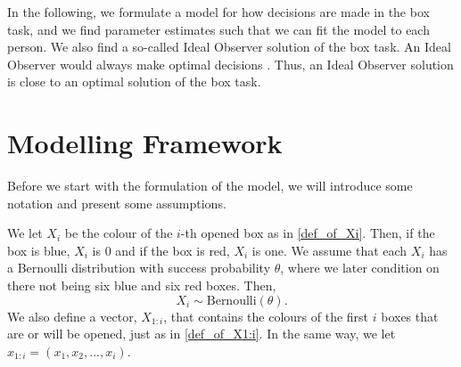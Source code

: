 In the following, we formulate a model for how decisions are made in the box task, and we find parameter estimates such that we can fit the model to each person. We also find a so-called Ideal Observer solution of the box task. An Ideal Observer would always make optimal decisions \citep{idealObs}. Thus, an Ideal Observer solution is close to an optimal solution of the box task. 



\section{Modelling Framework}
\label{section_notation}
Before we start with the formulation of the model, we will introduce some notation and present some assumptions. 

We let $X_i$ be the colour of the $i$-th opened box as in \eqref{def_of_Xi}. Then, if the box is blue, $X_i$ is 0 and if the box is red, $X_i$ is one.
We assume that each $X_i$ has a Bernoulli distribution with success probability $\theta$, where we later condition on there not being six blue and six red boxes. Then,
\begin{equation*}
    X_i \sim \text{Bernoulli}(\theta).
\end{equation*}
We also define a vector, $X_{1:i}$, that contains the colours of the first $i$ boxes that are or will be opened, just as in \eqref{def_of_X1:i}. In the same way, we let $x_{1:i} = (x_1,x_2,...,x_{i})$.

